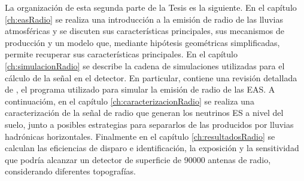 La organizaci\'on de esta segunda parte de la Tesis es la siguiente.
En el capítulo \ref{ch:easRadio} se realiza una introducción a la emisión de radio de las lluvias atmosféricas y se discuten sus características principales, sus mecanismos de producción y un modelo que, mediante hip\'otesis geom\'etricas simplificadas, permite recuperar sus características principales.
En el capítulo \ref{ch:simulacionRadio} se describe la cadena de simulaciones utilizadas para el c\'alculo de la se\~nal en el detector. 
En particular, contiene una revisión detallada de \zhs{}, el programa utilizado para simular la emisión de radio de las EAS.
A continuaci\'om, en el cap\'itulo \ref{ch:caracterizacionRadio} se realiza una caracterización de la señal de radio que generan los neutrinos ES  a nivel del suelo, junto a posibles estrategias para separarlos de las producidos por lluvias hadr\'onicas horizontales.
Finalmente en el capítulo \ref{ch:resultadosRadio} se calculan las eficiencias de disparo e identificaci\'on, la exposición y la sensitividad que podría alcanzar un detector de superficie de 90000 antenas de radio, considerando diferentes topografías.


